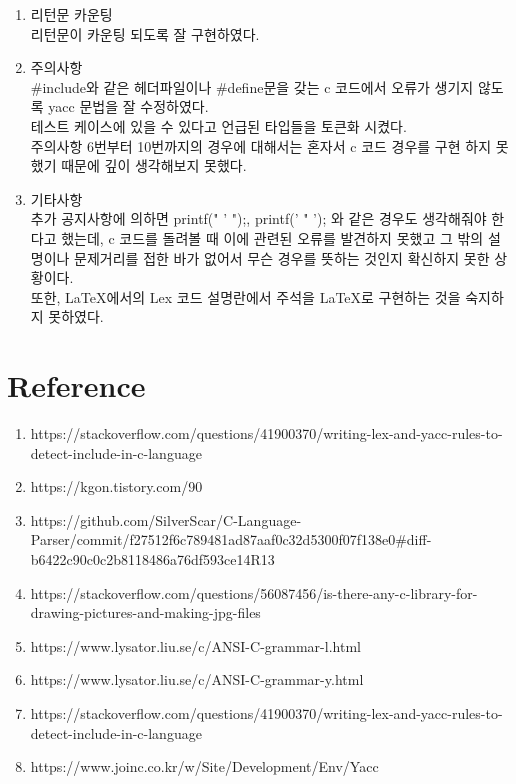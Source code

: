 \documentclass{article}
\begin{document}
\begin{enumerate}
    \item 리턴문 카운팅\\리턴문이 카운팅 되도록 잘 구현하였다.
    \item 주의사항\\#include와 같은 헤더파일이나 #define문을 갖는 c 코드에서 오류가 생기지 않도록 yacc 문법을 잘 수정하였다.\\테스트 케이스에 있을 수 있다고 언급된 타입들을 토큰화 시켰다. \\ 주의사항 6번부터 10번까지의 경우에 대해서는 혼자서 c 코드 경우를 구현 하지 못했기 때문에 깊이 생각해보지 못했다.
    \item 기타사항\\추가 공지사항에 의하면 printf(" ' ");, printf(' " '); 와 같은 경우도 생각해줘야 한다고 했는데, c 코드를 돌려볼 때 이에 관련된 오류를 발견하지 못했고 그 밖의 설명이나 문제거리를 접한 바가 없어서 무슨 경우를 뜻하는 것인지 확신하지 못한 상황이다.\\또한, LaTeX에서의 Lex 코드 설명란에서 주석을 LaTeX로 구현하는 것을 숙지하지 못하였다. 
\end{enumerate}

\section{Reference}
\begin{enumerate}
    \item https://stackoverflow.com/questions/41900370/writing-lex-and-yacc-rules-to-detect-include-in-c-language
    \item https://kgon.tistory.com/90
    \item https://github.com/SilverScar/C-Language-Parser/commit/f27512f6c789481ad87aaf0c32d5300f07f138e0#diff-b6422c90c0c2b8118486a76df593ce14R13
    \item https://stackoverflow.com/questions/56087456/is-there-any-c-library-for-drawing-pictures-and-making-jpg-files
    \item https://www.lysator.liu.se/c/ANSI-C-grammar-l.html
    \item https://www.lysator.liu.se/c/ANSI-C-grammar-y.html
    \item https://stackoverflow.com/questions/41900370/writing-lex-and-yacc-rules-to-detect-include-in-c-language
    \item https://www.joinc.co.kr/w/Site/Development/Env/Yacc

\end{enumerate}
\end{document}
